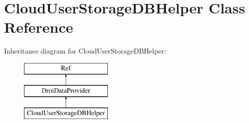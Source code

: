 \hypertarget{class_cloud_user_storage_d_b_helper}{}\section{Cloud\+User\+Storage\+D\+B\+Helper Class Reference}
\label{class_cloud_user_storage_d_b_helper}
Inheritance diagram for Cloud\+User\+Storage\+D\+B\+Helper\+:\begin{figure}[H]
\begin{center}
\leavevmode
\includegraphics[height=3.000000cm]{d0/d04/class_cloud_user_storage_d_b_helper}
\end{center}
\end{figure}
